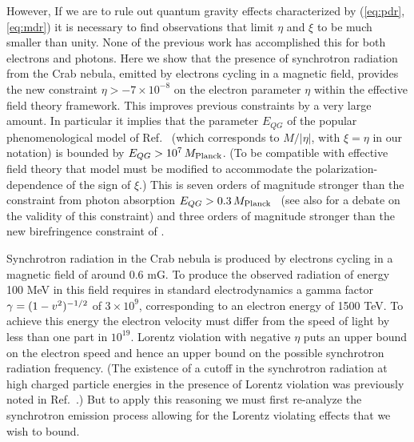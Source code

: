 \documentclass[12pt]{article}
\begin{document}
However, If we are to rule out quantum gravity effects
characterized by (\ref{eq:pdr},\ref{eq:mdr}) it
is necessary to find observations that limit $\eta$ and
$\xi$ to be much smaller than unity. None of the previous
work has accomplished this for both electrons and
photons. Here we show that the presence of
synchrotron radiation from the Crab nebula, emitted by
electrons cycling in a magnetic field, provides the new
constraint $\eta>-7\times 10^{-8}$ on the electron
parameter $\eta$ within the effective field theory
framework.  This improves previous constraints by a
very large amount. In particular it implies that the
parameter $E_{QG}$ of the popular phenomenological model
of Ref.~\cite{Amelino-Camelia:1997gz} (which corresponds
to $M/|\eta|$, with $\xi=\eta$ in our notation) is
bounded by $E_{QG}> 10^7\, M_{\rm Planck}$. (To be
compatible with effective field theory that model must be
modified to accommodate the polarization-dependence of
the sign of $\xi$.) This is seven orders of magnitude
stronger than the constraint from photon absorption
$E_{QG}> 0.3\, M_{\rm
  Planck}$~\cite{Jacobson:2001tu,JLM02,Stecker:2003ni}
(see also \cite{Amelino-Camelia:2002dx,Jacobson:2003ty}
for a debate on the validity of this constraint) and
three orders of magnitude stronger than the new
birefringence constraint of \cite{MP}.



Synchrotron radiation in the Crab nebula is produced by electrons
cycling in a magnetic field of around 0.6 mG. To produce the
observed radiation of energy 100 MeV in this field requires in
standard electrodynamics a gamma factor $\gamma=(1-v^2)^{-1/2}$ of
$3\times 10^{9}$, corresponding to an electron energy of 1500
TeV. To achieve this energy the electron velocity must differ from
the speed of light by less than one part in $10^{19}$.  Lorentz
violation with negative $\eta$ puts an upper bound on the electron
speed and hence an upper bound on the possible synchrotron
radiation frequency. (The existence of a cutoff
  in the synchrotron radiation at high charged particle
  energies in the presence of Lorentz violation was
  previously noted in Ref.~\cite{Gonzalez-Mestres:2000eh}.)
But to apply this reasoning we must first re-analyze the
synchrotron emission process allowing for the Lorentz violating
effects that we wish to bound.
\end{document}
